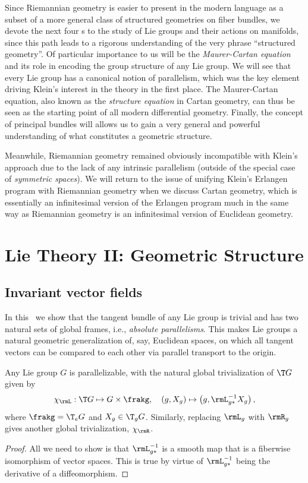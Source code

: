 \begin{hrem*}
    Since Riemannian geometry is easier to present in the modern language as a subset of a more general class of structured geometries on fiber bundles, we devote the next four \chap s to the study of Lie groups and their actions on manifolds, since this path leads to a rigorous understanding of the very phrase ``structured geometry''. Of particular importance to us will be the \emph{Maurer-Cartan equation} and its role in encoding the group structure of any Lie group. We will see that every Lie group has a canonical notion of parallelism, which was the key element driving Klein's interest in the theory in the first place. The Maurer-Cartan equation, also known as the \emph{structure equation} in Cartan geometry, can thus be seen as the starting point of all modern differential geometry. Finally, the concept of principal bundles will allows us to gain a very general and powerful understanding of what constitutes a geometric structure.
    
    Meanwhile, Riemannian geometry remained obviously incompatible with Klein's approach due to the lack of any intrinsic parallelism (outside of the special case of \emph{symmetric spaces}). We will return to the issue of unifying Klein's Erlangen program with Riemannian geometry when we discuss Cartan geometry, which is essentially an infinitesimal version of the Erlangen program much in the same way as Riemannian geometry is an infinitesimal version of Euclidean geometry.
\end{hrem*}





\chapter{Lie Theory II: Geometric Structure}\label{chap: Lie theory ii}

\section{Invariant vector fields}

In this \sect\ we show that the tangent bundle of any Lie group is trivial and has two natural sets of global frames, i.e., \emph{absolute parallelisms}. This makes Lie groups a natural geometric generalization of, say, Euclidean spaces, on which all tangent vectors can be compared to each other via parallel transport to the origin.

\begin{prop}
    Any Lie group $G$ is parallelizable, with the natural global trivialization of $\T G$ given by
    \[\chi_\rmL:\T G\mapsto G\times \frakg,\quad (g,X_g)\mapsto \left(g, \rmL_{g\ast }^{-1}X_g\right),\]
    where $\frakg=\T_e G$ and $X_g\in \T_gG$. Similarly, replacing $\rmL_g$ with $\rmR_g$ gives another global trivialization, $\chi_\rmR$.
\end{prop}
\begin{proof}
    All we need to show is that $\rmL_{g\ast}^{-1}$ is a smooth map that is a fiberwise isomorphism of vector spaces. This is true by virtue of $\rmL_{g\ast}^{-1}$ being the derivative of a diffeomorphism.
\end{proof}

